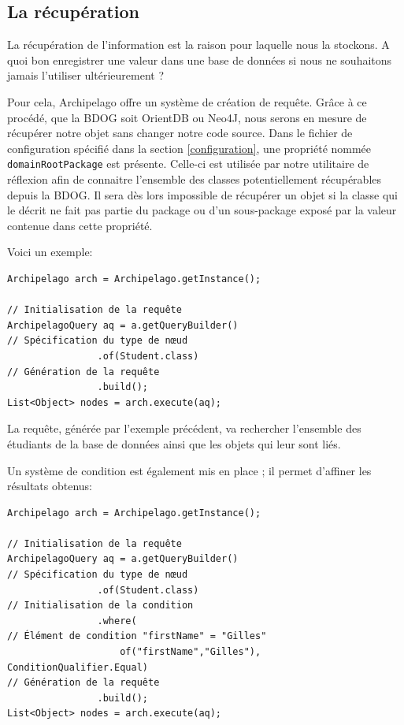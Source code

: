 \documentclass[a4paper,fleqn,12pt,oneside]{report}
\begin{document}
\subsection{La récupération}
\label{récupération}
La récupération de l'information est la raison pour laquelle nous la stockons. A quoi bon enregistrer une valeur dans une base de données si nous ne souhaitons jamais l'utiliser ultérieurement ?

Pour cela, Archipelago offre un système de création de requête. Grâce à ce procédé, que la BDOG soit OrientDB ou Neo4J, nous serons en mesure de récupérer notre objet sans changer notre code source. Dans le fichier de configuration spécifié dans la section \ref{configuration}, une propriété nommée \texttt{domainRootPackage} est présente. Celle-ci est utilisée par notre utilitaire de réflexion afin de connaitre l'ensemble des classes potentiellement récupérables depuis la BDOG. Il sera dès lors impossible de récupérer un objet si la classe qui le décrit ne fait pas partie du package ou d'un sous-package exposé par la valeur contenue dans cette propriété.

Voici un exemple:

\begin{lstlisting}
Archipelago arch = Archipelago.getInstance();

// Initialisation de la requête
ArchipelagoQuery aq = a.getQueryBuilder()
// Spécification du type de nœud
                .of(Student.class)
// Génération de la requête
                .build();
List<Object> nodes = arch.execute(aq);
\end{lstlisting}

La requête, générée par l'exemple précédent, va rechercher l'ensemble des étudiants de la base de données ainsi que les objets qui leur sont liés.

Un système de condition est également mis en place ; il permet d'affiner les résultats obtenus: 

\begin{lstlisting}
Archipelago arch = Archipelago.getInstance();

// Initialisation de la requête
ArchipelagoQuery aq = a.getQueryBuilder()
// Spécification du type de nœud
                .of(Student.class)
// Initialisation de la condition
                .where(
// Élément de condition "firstName" = "Gilles"
                	of("firstName","Gilles"), ConditionQualifier.Equal)
// Génération de la requête
                .build();
List<Object> nodes = arch.execute(aq);
\end{lstlisting}
\end{document}
